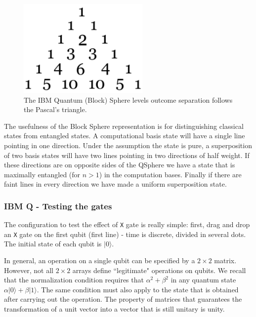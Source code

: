 \documentclass[a4paper,10pt]{article}
\begin{document}
\begin{enumerate}
    \begin{figure}[!htb]
    \begin{center}
    \includegraphics[width=2.5in]{images/ibmQuantumSphereLevelsOutcome.png}
    \caption{The IBM Quantum (Block) Sphere levels outcome separation follows the Pascal’s triangle.}
    \label{ibmQuantumSphereLevelsOutcome}
    \end{center}
    \end{figure}
    The usefulness of the Block Sphere representation is for distinguishing classical states from entangled states. A computational basis state will have a single line pointing in one direction. Under the assumption the state is pure, a superposition of two basis states will have two lines pointing in two directions of half weight. If these directions are on opposite sides of the QSphere we have a state that is maximally entangled (for $n>1$) in the computation bases. Finally if there are faint lines in every direction we have made a uniform superposition state.
\end{enumerate}

\subsubsection{IBM Q - Testing the gates} The configuration to test the effect of \texttt{X} gate is really simple: first, drag and drop an \texttt{X} gate on the first qubit (first line) - time is discrete, divided in several dots. The initial state of each qubit is $|0\rangle$.

In general, an operation on a single qubit can be specified by a $2 \times 2$ matrix. However, not all $2 \times 2$ arrays define ``legitimate" operations on qubits. We recall that the normalization condition requires that $\alpha^{2} + \beta^{2}$ in any quantum state $\alpha|0\rangle + \beta|1\rangle$. The same condition must also apply to the state that is obtained after carrying out the operation. The property of matrices that guarantees the transformation of a unit vector into a vector that is still unitary is unity.
\end{document}
